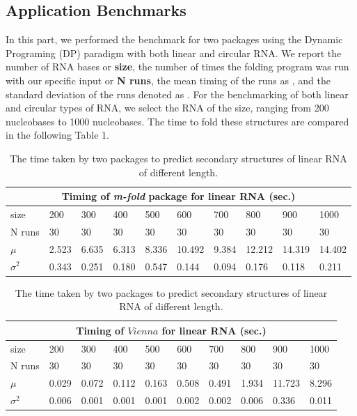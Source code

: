 \documentclass[12pt]{article}
\begin{document}
\subsection{Application Benchmarks}
\par In this part, we performed the benchmark for two packages using the Dynamic Programing (DP) paradigm with
both linear and circular RNA. We report the number of RNA bases or \textbf{size}, the number of times the folding
program was run with our specific input or \textbf{N runs}, the mean timing of the runs as \boldsymbol{$\mu$}, and the standard deviation of the
runs denoted as . For the benchmarking of both linear and circular types of RNA, we select the RNA of the size,
ranging from 200 nucleobases to 1000 nucleobases. The time to fold these structures are compared in the following Table 1.
\begin{table}[h!]
    \begin{tabular}{ |p{1.5cm}||p{1.05cm}|p{1.05cm}|p{1.05cm}|p{1.05cm}|p{1.05cm}|p{1.05cm}|p{1.05cm}| p{1.05cm} | p{1.05cm} |}
    \hline
    \multicolumn{10}{|c|}{Timing of \textit{m-fold} package for linear RNA (sec.)} \\
    \hline
    size& 200& 300& 400& 500& 600& 700 & 800 & 900 & 1000\\
    \hline
    N runs& 30 & 30& 30 & 30& 30& 30& 30& 30& 30\\
    \hline
    $\mu$& 2.523 & 6.635 & 6.313 & 8.336 & 10.492 & 9.384 & 12.212 & 14.319 & 14.402\\
    $\sigma^2$ &0.343 & 0.251 & 0.180 & 0.547 & 0.144 & 0.094 & 0.176 & 0.118 & 0.211 \\
    \hline
    \end{tabular}

    \begin{tabular}{ |p{1.5cm}||p{1.05cm}|p{1.05cm}|p{1.05cm}|p{1.05cm}|p{1.05cm}|p{1.05cm}|p{1.05cm}| p{1.05cm} | p{1.05cm} |}
    \hline
    \multicolumn{10}{|c|}{Timing of $Vienna$ for linear RNA (sec.)} \\
    \hline
    size& 200& 300& 400& 500& 600& 700 & 800 & 900 & 1000\\
    \hline
    N runs& 30 & 30& 30 & 30& 30& 30& 30& 30& 30\\
    \hline
    $\mu$& 0.029 & 0.072 & 0.112 & 0.163 & 0.508 & 0.491 & 1.934 & 11.723 & 8.296\\
    $\sigma^2$ &0.006 & 0.001 & 0.001 & 0.001 & 0.002 & 0.002 & 0.006 & 0.336 & 0.011 \\
    \hline
    \end{tabular}
\caption{The time taken by two packages to predict secondary structures of linear RNA of different length.}
\end{table}
\end{document}
